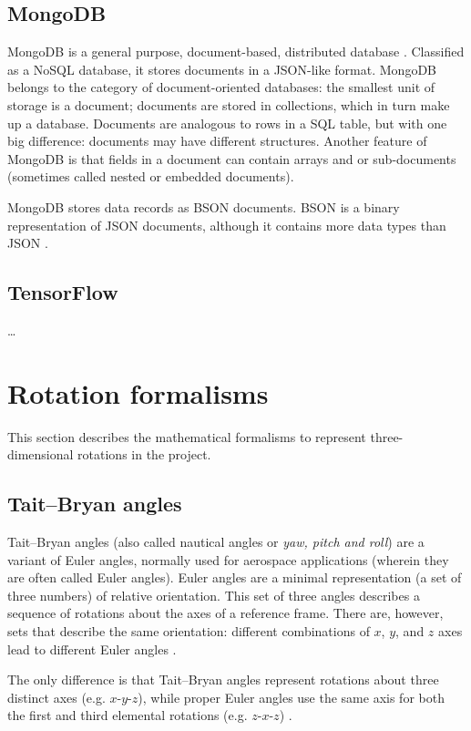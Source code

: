 \subsection{MongoDB}
MongoDB is a general purpose, document-based, distributed database \cite{MongoDB}. Classified as a NoSQL database, it stores documents in a JSON-like format. MongoDB belongs to the category of document-oriented databases: the smallest unit of storage is a document; documents are stored in collections, which in turn make up a database. Documents are analogous to rows in a SQL table, but with one big difference: documents may have different structures. Another feature of MongoDB is that fields in a document can contain arrays and or sub-documents (sometimes called nested or embedded documents).

MongoDB stores data records as BSON documents. BSON is a binary representation of JSON documents, although it contains more data types than JSON \cite{BSONSpec}.

\subsection{TensorFlow}
\dots

\section{Rotation formalisms}
This section describes the mathematical formalisms to represent three-dimensional rotations in the project.

\subsection{Tait–Bryan angles}
Tait–Bryan angles (also called nautical angles or \textit{yaw, pitch and roll}) are a variant of Euler angles, normally used for aerospace applications (wherein they are often called Euler angles). Euler angles are a minimal representation (a set of three numbers) of relative orientation. This set of three angles describes a sequence of rotations about the axes of a reference frame. There are, however, sets that describe the same orientation: different combinations of $x$, $y$, and $z$ axes lead to different Euler angles \cite{Rob20}.

The only difference is that Tait–Bryan angles represent rotations about three distinct axes (e.g. $x$-$y$-$z$), while proper Euler angles use the same axis for both the first and third elemental rotations (e.g. $z$-$x$-$z$) \cite{Sta18}.

